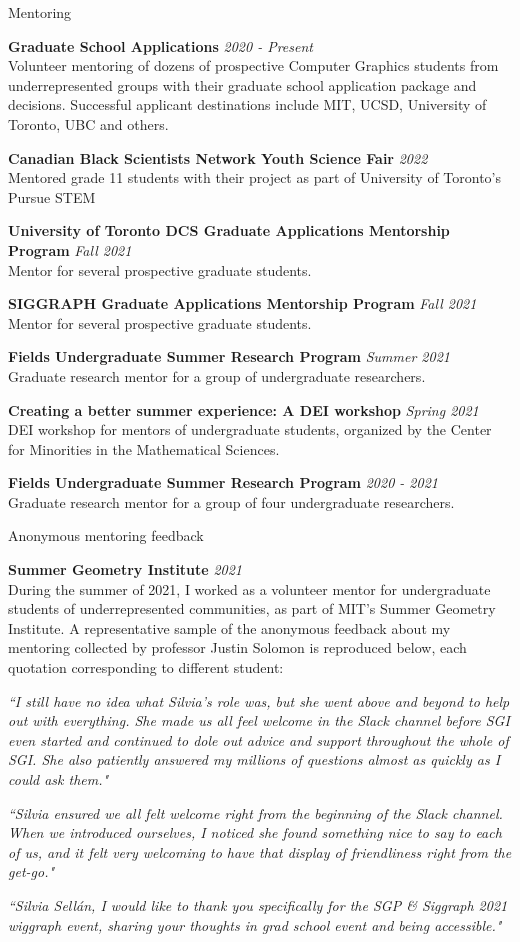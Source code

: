\documentclass{resume}
\newcommand{\cvitem}[3]{
    {\bf #1} \hfill {\em \small #2} \\ 
    {\small#3 }
}
\newcommand{\feedback}[1]{\it \small #1}
\begin{document}
\begin{rSection}{Mentoring}

\cvitem{Graduate School Applications}{2020 - Present}{Volunteer mentoring of dozens of prospective Computer Graphics students from underrepresented groups with their graduate school application package and decisions. Successful applicant destinations include MIT, UCSD, University of Toronto, UBC and others.}

\cvitem{Canadian Black Scientists Network Youth Science Fair}{2022}{Mentored grade 11 students with their project as part of University of Toronto's Pursue STEM}

\cvitem{University of Toronto DCS Graduate Applications Mentorship Program}{Fall 2021}{Mentor for several prospective graduate students.}

\cvitem{SIGGRAPH Graduate Applications Mentorship Program}{Fall 2021}{Mentor for several prospective graduate students.}

\cvitem{Fields Undergraduate Summer Research Program}{Summer 2021}{Graduate research mentor for a group of undergraduate researchers.}

\cvitem{Creating a better summer experience: A DEI workshop}{Spring 2021}{DEI workshop for mentors of undergraduate students, organized by the Center for Minorities in the Mathematical Sciences.}

\cvitem{Fields Undergraduate Summer Research Program}{2020 - 2021}{Graduate research mentor for a group of four undergraduate researchers.}

\end{rSection}

\begin{rSection}{Anonymous mentoring feedback}

\cvitem{Summer Geometry Institute}{2021}{During the summer of 2021, I worked as a volunteer mentor for undergraduate students of underrepresented communities, as part of MIT's Summer Geometry Institute. A representative sample of the anonymous feedback about my mentoring collected by professor Justin Solomon is reproduced below, each quotation corresponding to different student:}

\feedback{``I still have no idea what Silvia's role was, but she went above and beyond to help out with everything. She made us all feel welcome in the Slack channel before SGI even started and continued to dole out advice and support throughout the whole of SGI. She also patiently answered my millions of questions almost as quickly as I could ask them."}

\feedback{``Silvia ensured we all felt welcome right from the beginning of the Slack channel. When we introduced ourselves, I noticed she found something nice to say to each of us, and it felt very welcoming to have that display of friendliness right from the get-go."}

\feedback{``Silvia Sellán, I would like to thank you specifically for the SGP \& Siggraph 2021 wiggraph event, sharing your thoughts in grad school event and being accessible."}

\end{rSection}
\end{document}

